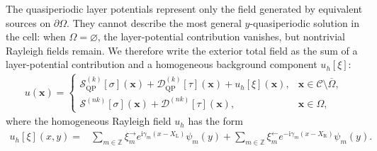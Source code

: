 \documentclass[11pt,fleqn]{article}
\newcommand{\ii}{\mathrm{i}}
\theoremstyle{definition}
\theoremstyle{remark}
\begin{document}
The quasiperiodic layer potentials represent only the field generated
by equivalent sources on $\partial\Omega$. They cannot describe the
most general $y$-quasiperiodic solution in the cell: when
$\Omega=\varnothing$, the layer-potential contribution vanishes, but
nontrivial Rayleigh fields remain. We therefore write the
exterior total field as the sum of a layer-potential contribution and
a homogeneous background component $u_h[\xi]$:
\begin{align}
  u(\mathbf{x}) = \begin{cases}
    \mathcal{S}^{(k)}_{\mathrm{QP}}[\sigma](\mathbf{x}) + \mathcal{D}^{(k)}_{\mathrm{QP}}[\tau](\mathbf{x}) + u_h[\xi](\mathbf{x}), & \mathbf{x} \in \mathcal{C}\setminus \overline{\Omega},\\
    \mathcal{S}^{(nk)}[\sigma](\mathbf{x}) + \mathcal{D}^{(nk)}[\tau](\mathbf{x}), & \mathbf{x} \in \Omega,
  \end{cases}
\end{align}
where the homogeneous Rayleigh field \(u_h\) has the form
\begin{align}
  u_h[\xi](x,y)
  ={}&\sum_{m\in\mathbb Z}
  \xi_m^\rightarrow e^{\ii\gamma_m(x-X_\mathrm{L})}\psi_m(y)
  +\sum_{m\in\mathbb Z}
  \xi_m^\leftarrow e^{-\ii\gamma_m(x-X_\mathrm{R})}\psi_m(y).
  \label{eq:homogeneous-field}
\end{align}
\end{document}
